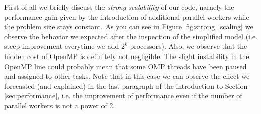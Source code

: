 \documentclass{article}
\begin{document}
First of all we briefly discuss the \emph{strong scalability} of our code, namely
the performance gain given by the introduction of additional parallel workers
while the problem size stays constant. As you can see in Figure
\ref{fig:strong_scaling} we observe the behavior we expected after the
inspection of the simplified model (i.e. steep improvement everytime we add
$2^k$ processors). Also, we observe that the hidden cost of OpenMP is definitely
not negligible. The slight instability in the OpenMP line could probably mean
that some OMP threads have been paused and assigned to other tasks. Note that
in this case we can observe the effect we forecasted (and explained)
in the last paragraph of the introduction to Section \ref{sec:performance}, i.e.
the improvement of performance even if the number of parallel workers is not
a power of 2.
\end{document}
